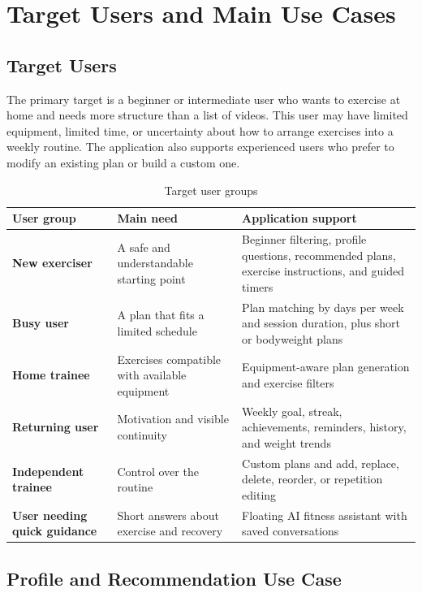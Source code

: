 \section{Target Users and Main Use Cases}

\subsection{Target Users}

The primary target is a beginner or intermediate user who wants to exercise at home and needs more structure than a list of videos. This user may have limited equipment, limited time, or uncertainty about how to arrange exercises into a weekly routine. The application also supports experienced users who prefer to modify an existing plan or build a custom one.

\begin{table}[ht]
\centering
\caption{Target user groups}
\label{tab:target-users}
\begin{tabularx}{\textwidth}{>{\raggedright\arraybackslash\bfseries}p{} >{\raggedright\arraybackslash}p{} >{\raggedright\arraybackslash}X}
\toprule
User group & Main need & Application support \\
\midrule
New exerciser & A safe and understandable starting point & Beginner filtering, profile questions, recommended plans, exercise instructions, and guided timers \\
Busy user & A plan that fits a limited schedule & Plan matching by days per week and session duration, plus short or bodyweight plans \\
Home trainee & Exercises compatible with available equipment & Equipment-aware plan generation and exercise filters \\
Returning user & Motivation and visible continuity & Weekly goal, streak, achievements, reminders, history, and weight trends \\
Independent trainee & Control over the routine & Custom plans and add, replace, delete, reorder, or repetition editing \\
User needing quick guidance & Short answers about exercise and recovery & Floating AI fitness assistant with saved conversations \\
\bottomrule
\end{tabularx}
\end{table}

\subsection{Profile and Recommendation Use Case}

